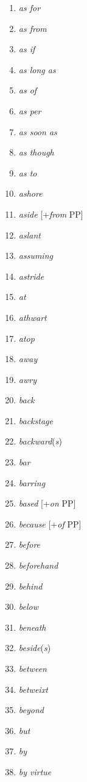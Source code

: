 \begin{multicols}{3}
\begin{enumerate}[noitemsep]
    \item \textit{as for}
    \item \textit{as from}
    \item \textit{as if}
    \item \textit{as long as}
    \item \textit{as of}
    \item \textit{as per}
    \item \textit{as soon as}
    \item \textit{as though}
    \item \textit{as to}
    \item \textit{ashore}
    \item \textit{aside} [+\textit{from} PP]
    \item \textit{aslant}
    \item \textit{assuming}
    \item \textit{astride}
    \item \textit{at}
    \item \textit{athwart}
    \item \textit{atop}
    \item \textit{away}
    \item \textit{awry}
    \item \textit{back}
    \item \textit{backstage}
    \item \textit{backward}(\textit{s})
    \item \textit{bar}
    \item \textit{barring}
    \item \textit{based} [+\textit{on} PP]
    \item \textit{because} [+\textit{of} PP]
    \item \textit{before}
    \item \textit{beforehand}
    \item \textit{behind}
    \item \textit{below}
    \item \textit{beneath}
    \item \textit{beside}(\textit{s})
    \item \textit{between}
    \item \textit{betweixt}
    \item \textit{beyond}
    \item \textit{but}
    \item \textit{by}
    \item \textit{by virtue}

\end{enumerate}
\end{multicols}

